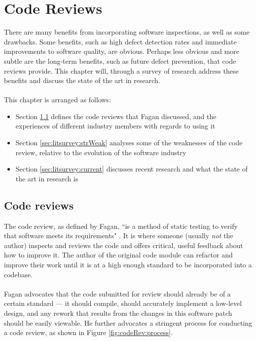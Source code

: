 \chapter{Code Reviews} \label{chapter:litsurvey}

There are many benefits from incorporating software inspections, as well as
some drawbacks.
Some benefits, such as high defect detection rates and immediate improvements to software quality, are
obvious.
Perhaps less obvious and more subtle are the long-term benefits, such as future
defect prevention, that code reviews provide.
This chapter will, through a survey of research address these benefits and discuss the state of the
art in research.\\
\\
This chapter is arranged as follows:
\begin{itemize}
	\item Section \ref{sec:litsurvey:codeRev} defines the code reviews that Fagan discussed, and the
		experiences of different industry members with regards to using it
	\item Section \ref{sec:litsurvey:strWeak} analyses some of the weaknesses of the code review,
		relative to the evolution of the software industry
	\item Section \ref{sec:litsurvey:current} discusses recent research and what the state of the art
		in research is
\end{itemize}

\section{Code reviews} \label{sec:litsurvey:codeRev}

The code review, as defined by Fagan, ``is a method of static testing to verify that software meets
its requirements" \cite{AdvancesInSoftwareInspection}.
It is where someone (usually {\it not} the author) inspects and reviews the code and offers
critical, useful feedback about how to improve it.
The author of the original code module can refactor and improve their work until it is at a high
enough standard to be incorporated into a codebase.\\
\\
Fagan \cite{AdvancesInSoftwareInspection} advocates that the code submitted for review should
already be of a certain standard --- it should compile, should accurately implement a low-level
design, and any rework that results from the changes in this software patch should be easily
viewable.
He further advocates a stringent process for conducting a code review, as shown in Figure
\ref{fig:codeRev:process}.

